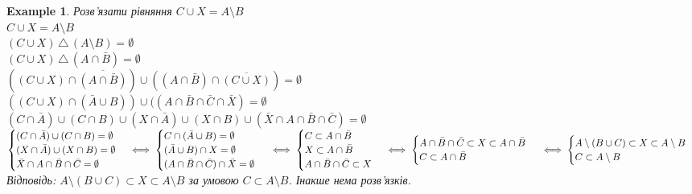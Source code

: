 \documentclass[a4paper, 14pt]{extarticle}
\theoremstyle{theoremdd}
\theoremstyle{theoremdd}
\theoremstyle{theoremdd}
\theoremstyle{theoremdd}
\theoremstyle{theoremdd}
\newtheorem{example}[theorem]{Example}
\theoremstyle{theoremdd}
\theoremstyle{theoremdd}
\theoremstyle{theoremdd}
\theoremstyle{theoremdd}
\theoremstyle{theoremdd}
\theoremstyle{theoremdd}
\theoremstyle{theoremdd}
\theoremstyle{theoremdd}
\theoremstyle{theoremdd}
\theoremstyle{theoremdd}
\newcommand{\symdif}{\,\triangle\,} %
\begin{document}
\begin{example}
Розв'язати рівняння $C \cup X = A \setminus B$\\
$C \cup X = A \setminus B$\\
$(C \cup X) \symdif (A \setminus B) = \emptyset$\\
$(C \cup X) \symdif (A \cap \bar{B}) = \emptyset$\\
$((C \cup X) \cap \overline{(A \cap \bar{B})}) \cup ((A \cap \bar{B}) \cap \overline{(C \cup X)}) = \emptyset$\\
$((C \cup X) \cap (\bar{A} \cup B)) \cup ((A \cap \bar{B} \cap \bar{C} \cap \bar{X}) = \emptyset$\\
$(C \cap \bar{A}) \cup (C \cap B) \cup (X \cap \bar{A}) \cup (X \cap B) \cup (\bar{X} \cap A \cap \bar{B} \cap \bar{C}) = \emptyset$\\
$\begin{cases}
(C \cap \bar{A}) \cup (C \cap B) = \emptyset \\
(X \cap \bar{A}) \cup (X \cap B) = \emptyset \\
\bar{X} \cap A \cap \bar{B} \cap \bar{C} = \emptyset
\end{cases} \iff
\begin{cases}
C \cap (\bar{A} \cup B) = \emptyset \\
(\bar{A} \cup B) \cap X = \emptyset \\
(A \cap \bar{B} \cap \bar{C}) \cap \bar{X} = \emptyset
\end{cases} \\
\iff
\begin{cases}
C \subset A \cap \bar{B} \\
X \subset A \cap \bar{B} \\
A \cap \bar{B} \cap \bar{C} \subset X
\end{cases} \iff
\begin{cases}
A \cap \bar{B} \cap \bar{C} \subset X \subset A \cap \bar{B} \\
C \subset A \cap \bar{B}
\end{cases} \\
\iff \begin{cases}
A \setminus (B \cup C) \subset X \subset A \setminus B \\
C \subset A \setminus B
\end{cases}$\\
Відповідь: $A \setminus (B \cup C) \subset X \subset A \setminus B$ за умовою $C \subset A \setminus B$. Інакше нема розв'язків.
\end{example}
\end{document}
